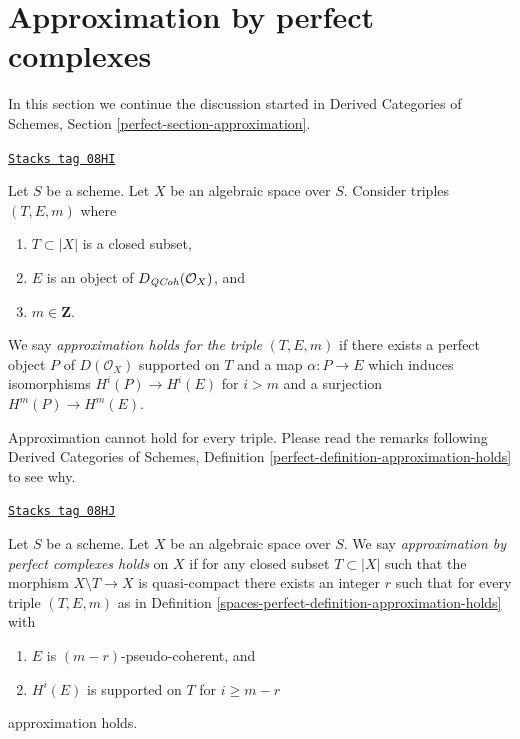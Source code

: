 \section{Approximation by perfect complexes}
\label{spaces-perfect-section-approximation}
In this section we continue the discussion started in
Derived Categories of Schemes, Section \ref{perfect-section-approximation}.

\begin{definition}
\label{spaces-perfect-definition-approximation-holds}
\href{https://stacks.math.columbia.edu/tag/08HI}{\texttt{Stacks tag 08HI}}

Let $S$ be a scheme. Let $X$ be an algebraic space over $S$.
Consider triples $(T, E, m)$ where
\begin{enumerate}
\item $T \subset |X|$ is a closed subset,
\item $E$ is an object of $D_{\mathit{QCoh}}(\mathcal{O}_X)$, and
\item $m \in \mathbf{Z}$.
\end{enumerate}
We say {\it approximation holds for the triple} $(T, E, m)$ if
there exists a perfect object $P$ of $D(\mathcal{O}_X)$ supported on $T$
and a map $\alpha : P \to E$ which induces isomorphisms $H^i(P) \to H^i(E)$
for $i > m$ and a surjection $H^m(P) \to H^m(E)$.
\end{definition}

Approximation cannot hold for every triple. Please read the remarks following
Derived Categories of Schemes, Definition
\ref{perfect-definition-approximation-holds} to see why.

\begin{definition}[Approximation]
\label{spaces-perfect-definition-approximation}
\href{https://stacks.math.columbia.edu/tag/08HJ}{\texttt{Stacks tag 08HJ}}

Let $S$ be a scheme. Let $X$ be an algebraic space over $S$.
We say {\it approximation by perfect complexes holds}
on $X$ if for any closed subset $T \subset |X|$ such that
the morphism $X \setminus T \to X$ is quasi-compact
there exists an integer $r$ such that for every triple $(T, E, m)$ as in
Definition \ref{spaces-perfect-definition-approximation-holds} with
\begin{enumerate}
\item $E$ is $(m - r)$-pseudo-coherent, and
\item $H^i(E)$ is supported on $T$ for $i \geq m - r$
\end{enumerate}
approximation holds.
\end{definition}

